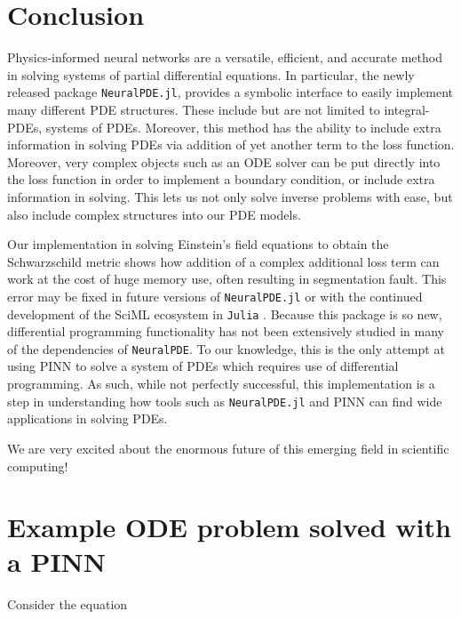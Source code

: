 \documentclass{CUP-JNL-DTM}%
\theoremstyle{definition}
\numberwithin{equation}{section}
\newcommand{\Julia}{\texttt{Julia} }
\begin{document}
\section{Conclusion}

Physics-informed neural networks are a versatile, efficient, and accurate method in solving systems of partial differential equations. In particular, the newly released package \texttt{NeuralPDE.jl}, provides a symbolic interface to easily implement many different PDE structures. These include but are not limited to integral-PDEs, systems of PDEs. Moreover, this method has the ability to include extra information in solving PDEs via addition of yet another term to the loss function. Moreover, very complex objects such as an ODE solver can be put directly into the loss function in order to implement a boundary condition, or include extra information in solving. This lets us not only solve inverse problems with ease, but also include complex structures into our PDE models. 

Our implementation in solving Einstein's field equations to obtain the Schwarzschild metric shows how addition of a complex additional loss term can work at the cost of huge memory use, often resulting in segmentation fault. This error may be fixed in future versions of \texttt{NeuralPDE.jl} or with the continued development of the SciML ecosystem in \Julia. Because this package is so new, differential programming functionality has not been extensively studied in many of the dependencies of \texttt{NeuralPDE}. To our knowledge, this is the only attempt at using PINN to solve a system of PDEs which requires use of differential programming. As such, while not perfectly successful, this implementation is a step in understanding how tools such as \texttt{NeuralPDE.jl} and PINN can find wide applications in solving PDEs. 

We are very excited about the enormous future of this emerging field in scientific computing!


\appendix

\section{Example ODE problem solved with a PINN}
\label{ODE_example}
	
Consider the equation
\end{document}
